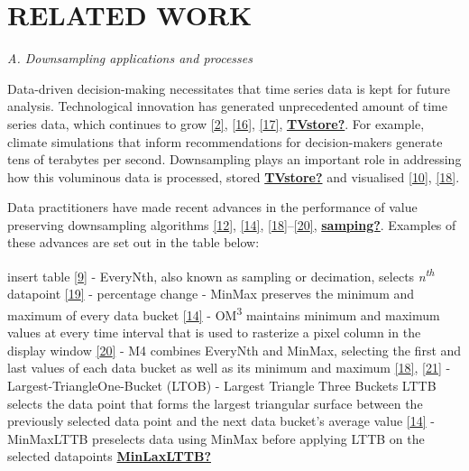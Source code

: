 \documentclass{article}
\begin{document}
\label{sec:headings}

\hypertarget{related-work}{%
\section{RELATED WORK}\label{related-work}}

\label{sec:headings}

\emph{A. Downsampling applications and processes}

Data-driven decision-making necessitates that time series data is kept
for future analysis. Technological innovation has generated
unprecedented amount of time series data, which continues to grow
\protect\hyperlink{ref-data2020}{{[}2{]}},
\protect\hyperlink{ref-storage}{{[}16{]}},
\protect\hyperlink{ref-CatchUp}{{[}17{]}},
\protect\hyperlink{ref-TVstore}{\textbf{TVstore?}}. For example, climate
simulations that inform recommendations for decision-makers generate
tens of terabytes per second. Downsampling plays an important role in
addressing how this voluminous data is processed, stored
\protect\hyperlink{ref-TVstore}{\textbf{TVstore?}} and visualised
\protect\hyperlink{ref-Sveinn}{{[}10{]}},
\protect\hyperlink{ref-dashql}{{[}18{]}}.

Data practitioners have made recent advances in the performance of value
preserving downsampling algorithms
\protect\hyperlink{ref-downsampling}{{[}12{]}},
\protect\hyperlink{ref-MinMaxLTTB}{{[}14{]}},
\protect\hyperlink{ref-dashql}{{[}18{]}}--\protect\hyperlink{ref-MinMaxOrdered}{{[}20{]}},
\protect\hyperlink{ref-samping}{\textbf{samping?}}. Examples of these
advances are set out in the table below:

insert table \protect\hyperlink{ref-datapoint}{{[}9{]}} - EveryNth, also
known as sampling or decimation, selects \emph{n\textsuperscript{th}}
datapoint \protect\hyperlink{ref-EveryNth}{{[}19{]}} - percentage change
- MinMax preserves the minimum and maximum of every data bucket
\protect\hyperlink{ref-MinMaxLTTB}{{[}14{]}} - OM\textsuperscript{3}
maintains minimum and maximum values at every time interval that is used
to rasterize a pixel column in the display window
\protect\hyperlink{ref-MinMaxOrdered}{{[}20{]}} - M4 combines EveryNth
and MinMax, selecting the first and last values of each data bucket as
well as its minimum and maximum
\protect\hyperlink{ref-dashql}{{[}18{]}},
\protect\hyperlink{ref-M4}{{[}21{]}} - Largest-TriangleOne-Bucket (LTOB)
- Largest Triangle Three Buckets LTTB selects the data point that forms
the largest triangular surface between the previously selected data
point and the next data bucket's average value
\protect\hyperlink{ref-MinMaxLTTB}{{[}14{]}} - MinMaxLTTB preselects
data using MinMax before applying LTTB on the selected datapoints
\protect\hyperlink{ref-MinLaxLTTB}{\textbf{MinLaxLTTB?}}
\end{document}
